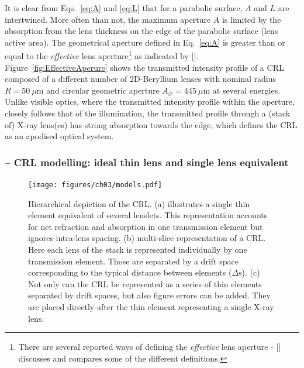 \begin{refsection}
It is clear from Eqs.~\ref{eq:A} and \ref{eq:L} that for a parabolic surface, $A$ and $L$ are intertwined. More often than not, the maximum aperture $A$ is limited by the absorption from the lens thickness on the edge of the parabolic surface (lens active area). The geometrical aperture defined in Eq.~\ref{eq:A} is greater than or equal to the \textit{effective} lens aperture\footnote{There are several reported ways of defining the \textit{effective} lens aperture - [\cite{Kohn2017}] discusses and compares some of the different definitions. } as indicated by [\cite{Kohn2017}]. Figure~\ref{fig:EffectiveAperure} shows the transmitted intensity profile of a CRL composed of a different number of 2D-Beryllium lenses with nominal radius $R=50~\mu\mathrm{m}$ and circular geometric aperture $A_{\diameter}=445~ \mu\mathrm{m}$ at several energies. Unlike visible optics, where the transmitted intensity profile within the aperture, closely follows that of the illumination, the transmitted profile through a (stack of) X-ray lens(es) has strong absorption towards the edge, which defines the CRL as an apodised optical system.


\subsubsection*{-- CRL modelling: ideal thin lens and single lens equivalent}

\begin{figure}[t]
    \centering
    {\texttt{[image: figures/ch03/models.pdf]}}
    \caption[Hierarchical CRL representation]{Hierarchical depiction of the CRL. (a) illustrates a single thin element equivalent of several lenslets. This representation accounts for net refraction and absorption in one transmission element but ignores intra-lens spacing. (b) multi-slice representation of a CRL. Here each lens of the stack is represented individually by one transmission element. Those are separated by a drift space corresponding to the typical distance between elements ($\Delta\text{s}$). (c) Not only can the CRL be represented as a series of thin elements separated by drift spaces, but also figure errors can be added. They are placed directly after the thin element representing a single X-ray lens.}
    \label{fig:models}
\end{figure}


\end{refsection}
